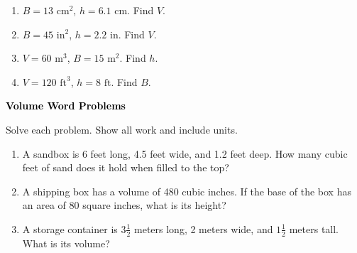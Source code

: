 \documentclass[12pt, letterpaper, fleqn]{article}
\begin{document}
\begin{enumerate}[itemsep=2.3cm, leftmargin=0.6cm]

\item $B = 13\text{ cm}^2$, $h = 6.1\text{ cm}$. Find $V$.

\vspace{2cm}

\item $B = 45\text{ in}^2$, $h = 2.2\text{ in}$. Find $V$.

\vspace{2cm}

\item $V = 60\text{ m}^3$, $B = 15\text{ m}^2$. Find $h$.

\vspace{2cm}

\item $V = 120\text{ ft}^3$, $h = 8\text{ ft}$. Find $B$.

\vspace{2cm}

\end{enumerate}

\newpage

\begin{tcolorbox}[colback=black!10]
\large\textcolor{black}{\textbf{Volume Word Problems}}
\end{tcolorbox}

\noindent
Solve each problem. Show all work and include units.

\vspace{3mm}

\begin{enumerate}[itemsep=2.4cm, leftmargin=0.6cm]

\item A sandbox is 6 feet long, 4.5 feet wide, and 1.2 feet deep. How many cubic feet of sand does it hold when filled to the top?

\vspace{2.3cm}

\item A shipping box has a volume of 480 cubic inches. If the base of the box has an area of 80 square inches, what is its height?

\vspace{2.3cm}

\item A storage container is $3\frac{1}{2}$ meters long, 2 meters wide, and $1\frac{1}{2}$ meters tall. What is its volume?

\vspace{2.5cm}

\end{enumerate}
\end{document}
